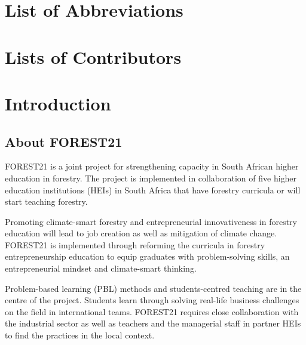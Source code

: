 \documentclass[
  11pt,
]{article}
\begin{document}
\clearpage

\hypertarget{list-of-abbreviations}{%
\section*{List of Abbreviations}\label{list-of-abbreviations}}

\clearpage

\hypertarget{lists-of-contributors}{%
\section*{Lists of Contributors}\label{lists-of-contributors}}

\clearpage


\clearpage

\hypertarget{introduction}{%
\section{Introduction}\label{introduction}}

\hypertarget{about-forest21}{%
\subsection{About FOREST21}\label{about-forest21}}

FOREST21 is a joint project for strengthening capacity in South African
higher education in forestry. The project is implemented in
collaboration of five higher education institutions (HEIs) in South
Africa that have forestry curricula or will start teaching forestry.

Promoting climate-smart forestry and entrepreneurial innovativeness in
forestry education will lead to job creation as well as mitigation of
climate change. FOREST21 is implemented through reforming the curricula
in forestry entrepreneurship education to equip graduates with
problem-solving skills, an entrepreneurial mindset and climate-smart
thinking.

Problem-based learning (PBL) methods and students-centred teaching are
in the centre of the project. Students learn through solving real-life
business challenges on the field in international teams. FOREST21
requires close collaboration with the industrial sector as well as
teachers and the managerial staff in partner HEIs to find the practices
in the local context.
\end{document}
